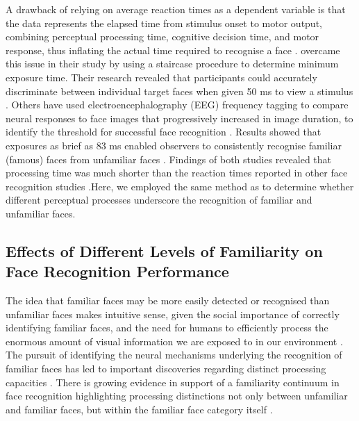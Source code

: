 \documentclass[
  10pt,
  letterpaper,
]{article}
\begin{document}
A drawback of relying on average reaction times as a dependent variable
is that the data represents the elapsed time from stimulus onset to
motor output, combining perceptual processing time, cognitive decision
time, and motor response, thus inflating the actual time required to
recognise a face \citep{alzueta2019a, burton2015a, caharel2014a}.
\citet{taubert2011a} overcame this issue in their study by using a
staircase procedure to determine minimum exposure time. Their research
revealed that participants could accurately discriminate between
individual target faces when given 50 ms to view a stimulus
\citep{taubert2011a}. Others have used electroencephalography (EEG)
frequency tagging to compare neural responses to face images that
progressively increased in image duration, to identify the threshold for
successful face recognition \citep{quek2021a, dobs_how_2019}. Results
showed that exposures as brief as 83 ms enabled observers to
consistently recognise familiar (famous) faces from unfamiliar faces
\citep{quek2021a}. Findings of both studies revealed that processing
time was much shorter than the reaction times reported in other face
recognition studies \citep{besson2016a, blauch2021a, oruc2019a}.Here, we
employed the same method as \citet{taubert2011a} to determine whether
different perceptual processes underscore the recognition of familiar
and unfamiliar faces.

\subsection{Effects of Different Levels of Familiarity on Face
Recognition
Performance}\label{effects-of-different-levels-of-familiarity-on-face-recognition-performance}

The idea that familiar faces may be more easily detected or recognised
than unfamiliar faces makes intuitive sense, given the social importance
of correctly identifying familiar faces, and the need for humans to
efficiently process the enormous amount of visual information we are
exposed to in our environment \citep{tong1999a}. The pursuit of
identifying the neural mechanisms underlying the recognition of familiar
faces has led to important discoveries regarding distinct processing
capacities \citep{bortolon2017a, ramon2017a}. There is growing evidence
in support of a familiarity continuum in face recognition highlighting
processing distinctions not only between unfamiliar and familiar faces,
but within the familiar face category itself
\citep{megraya2006a, murphy2015a, quek2021a, wiese2021a}.
\end{document}

